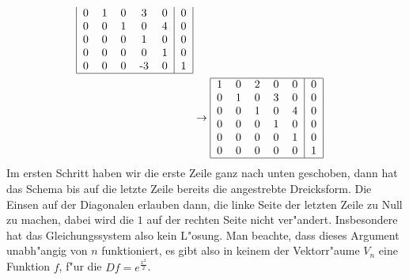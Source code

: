 \begin{loesung}
\begin{teilaufgaben}
\begin{align*}
\begin{tabular}{|ccccc|c|}
0&1&0&3&0&0\\
0&0&1&0&4&0\\
0&0&0&1&0&0\\
0&0&0&0&1&0\\
0&0&0&-3&0&1\\
\hline
\end{tabular}
\\
&\rightarrow
\begin{tabular}{|ccccc|c|}
\hline
1&0&2&0&0&0\\
0&1&0&3&0&0\\
0&0&1&0&4&0\\
0&0&0&1&0&0\\
0&0&0&0&1&0\\
0&0&0&0&0&1\\
\hline
\end{tabular}
\end{align*}
Im ersten Schritt haben wir die erste Zeile ganz nach unten geschoben,
dann hat das Schema bis auf die letzte Zeile bereits die angestrebte
Dreicksform. Die Einsen auf der Diagonalen erlauben dann, die linke
Seite der letzten Zeile zu Null zu machen, dabei wird die $1$ auf der
rechten Seite nicht ver"andert. Insbesondere hat das Gleichungssystem
also kein L"osung. Man beachte, dass dieses Argument unabh"angig von
$n$ funktioniert, es gibt also in keinem der Vektorr"aume $V_n$
eine Funktion $f$, f"ur die $Df=e^{\frac{x^2}2}$.
\qedhere
\end{teilaufgaben}
\end{loesung}


